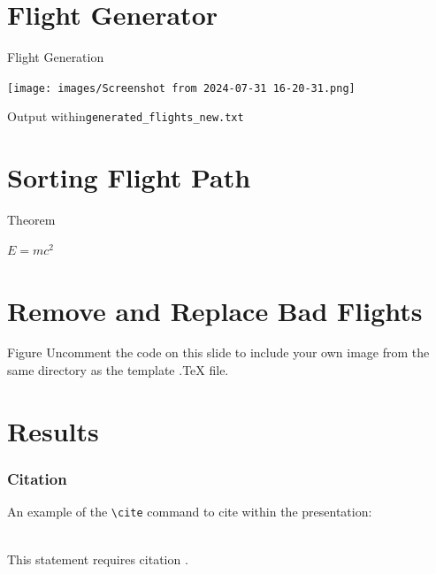 \documentclass[aspectratio=169,xcolor=dvipsnames]{beamer}
\begin{document}
\section{Flight Generator}

\begin{frame}{Flight Generation}
   \begin{minipage}{0.45\textwidth}
        \centering
        \texttt{[image: images/Screenshot from 2024-07-31 16-20-31.png]}
        \caption{Output within\texttt{generated\_flights\_new.txt}}
    \end{minipage}
    \hfill
 
\end{frame}
\section{Sorting Flight Path}

\begin{frame}{Theorem}
    \begin{theorem}
        $E = mc^2$
    \end{theorem}
\end{frame}

\section{Remove and Replace Bad Flights}

\begin{frame}{Figure}
    Uncomment the code on this slide to include your own image from the same directory as the template .TeX file.
\end{frame}

\section{Results}

\begin{frame}[fragile] %
    \frametitle{Citation}
    An example of the \verb|\cite| command to cite within the presentation:\\~

    This statement requires citation \cite{p1}.
\end{frame}
\end{document}
